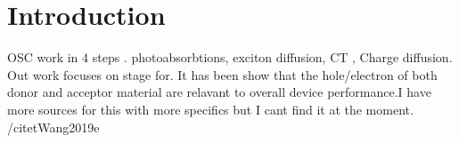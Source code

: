 \chapter{Introduction}

OSC work in 4 steps . photoabsorbtions, exciton diffusion, CT , Charge diffusion. \citet{Fusella2019}
Out work focuses on stage for. It has been show that the hole/electron of both donor and 
acceptor material are relavant to overall device performance.I have more sources for this with more specifics but I cant find it at the moment.  /citet{Wang2019e}

